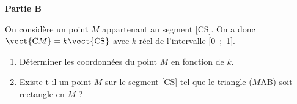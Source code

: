 \smallskip

\begin{center}\textbf{Partie B} \end{center}

On considère un point $M$ appartenant au segment [CS]. On a donc $\vect{\text{C}M} = k\vect{\text{CS}}$ avec  $k$ réel de l'intervalle [0~;~1].

\medskip

\begin{enumerate}
\item Déterminer les coordonnées du point $M$ en fonction de $k$.
\item Existe-t-il un point $M$ sur le segment [CS] tel que le triangle ($M$AB) soit rectangle
en $M$ ?
\end{enumerate}

\bigskip

